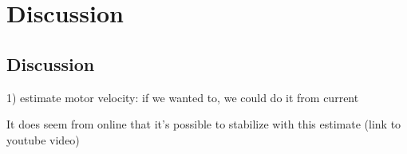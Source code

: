 \documentclass[conference]{IEEEtran}
\begin{document}
%




\section{Discussion}

\subsection{Discussion}

1) estimate motor velocity: if we wanted to, we could do it from current

It does seem from online that it's possible to stabilize with this estimate
(link to youtube video)
\end{document}
